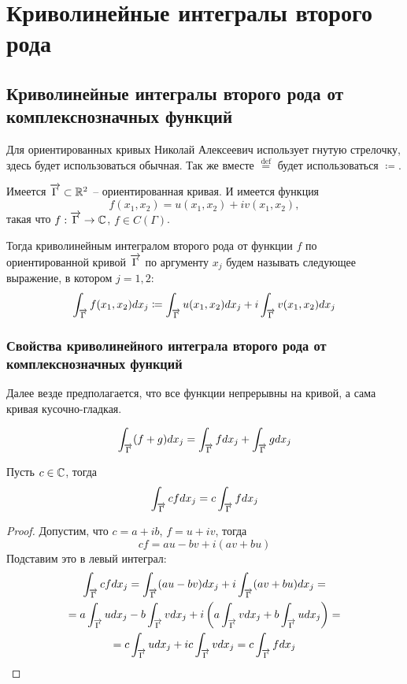 \documentclass[main]{subfiles}
\begin{document}
\chapter{Криволинейные интегралы второго рода}
\section{Криволинейные интегралы второго рода от комплекснозначных функций} 
Для ориентированных кривых Николай Алексеевич использует гнутую стрелочку, здесь будет использоваться обычная.
Так же вместе $\stackrel{\text{def}}{=}$ будет использоваться $\coloneqq$.
\begin{definition}
    Имеется $\AnClOrCurve \subset \R^2$ -- ориентированная кривая.
    И имеется функция \[f(x_1, x_2) = u(x_1, x_2) + i v(x_1, x_2),\] такая что $f: \AnClOrCurve \to \C$, $f \in C(\Gamma)$.

    Тогда криволинейным интегралом второго рода от функции $f$ по ориентированной кривой $\AnClOrCurve$ по аргументу $x_j$ будем называть следующее выражение, в котором $j=1,2$:
    \[\AnClOrInt f(x_1, x_2) dx_j \coloneqq \AnClOrInt u(x_1, x_2) dx_j + i \AnClOrInt v(x_1, x_2) dx_j\]
\end{definition}

\subsection{Свойства криволинейного интеграла второго рода от комплекснозначных функций}
Далее везде предполагается, что все функции непрерывны на кривой, а сама кривая кусочно-гладкая.

\begin{property}
    \[\AnClOrInt (f+g) dx_j = \AnClOrInt f dx_j + \AnClOrInt g dx_j\]
\end{property}

\begin{property}
    Пусть $c \in \mathbb{C}$, тогда
    \[\AnClOrInt c f dx_j = c \AnClOrInt f dx_j\]
\end{property}
\begin{proof}
    Допустим, что $c = a + ib$, $f = u + iv$, тогда
    \[cf = au - bv + i(av + bu)\]
    Подставим это в левый интеграл:
    \begin{multline*}
        \AnClOrInt c f dx_j = \AnClOrInt (au - bv) dx_j + i \AnClOrInt (av + bu) dx_j =\\
        = a \AnClOrInt u dx_j - b \AnClOrInt v dx_j + i\left(a \AnClOrInt v dx_j + b \AnClOrInt u dx_j\right) = \\
        = c \AnClOrInt u dx_j + i c \AnClOrInt v dx_j = c \AnClOrInt f dx_j
    \end{multline*}
\end{proof}
\end{document}
